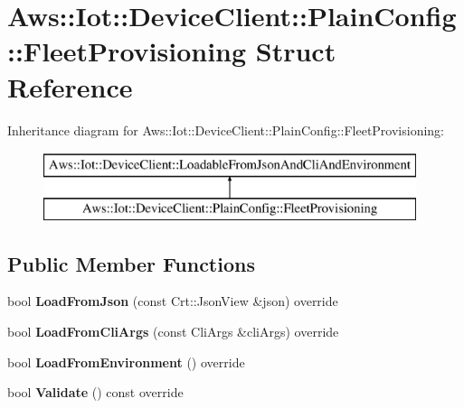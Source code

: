 \hypertarget{struct_aws_1_1_iot_1_1_device_client_1_1_plain_config_1_1_fleet_provisioning}{}\section{Aws\+:\+:Iot\+:\+:Device\+Client\+:\+:Plain\+Config\+:\+:Fleet\+Provisioning Struct Reference}
\label{struct_aws_1_1_iot_1_1_device_client_1_1_plain_config_1_1_fleet_provisioning}
Inheritance diagram for Aws\+:\+:Iot\+:\+:Device\+Client\+:\+:Plain\+Config\+:\+:Fleet\+Provisioning\+:\begin{figure}[H]
\begin{center}
\leavevmode
\includegraphics[height=2.000000cm]{struct_aws_1_1_iot_1_1_device_client_1_1_plain_config_1_1_fleet_provisioning}
\end{center}
\end{figure}
\subsection*{Public Member Functions}
\begin{DoxyCompactItemize}
\item 
\mbox{\label{struct_aws_1_1_iot_1_1_device_client_1_1_plain_config_1_1_fleet_provisioning_a08d5b24b9b9e6360e221b0578ca38d38}} 
bool {\bfseries Load\+From\+Json} (const Crt\+::\+Json\+View \&json) override
\item 
\mbox{\label{struct_aws_1_1_iot_1_1_device_client_1_1_plain_config_1_1_fleet_provisioning_a173b6166bce025a4a7b04f0172545313}} 
bool {\bfseries Load\+From\+Cli\+Args} (const Cli\+Args \&cli\+Args) override
\item 
\mbox{\label{struct_aws_1_1_iot_1_1_device_client_1_1_plain_config_1_1_fleet_provisioning_a577c310f58658f6c3f43e5239aef7d17}} 
bool {\bfseries Load\+From\+Environment} () override
\item 
\mbox{\label{struct_aws_1_1_iot_1_1_device_client_1_1_plain_config_1_1_fleet_provisioning_a0e79dc00cd1ceb208736240a650d5004}} 
bool {\bfseries Validate} () const override
\end{DoxyCompactItemize}
